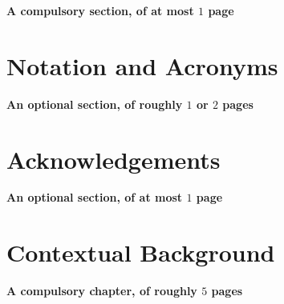 \documentclass[ %
                    author={Alexander Dalton},
                supervisor={Prof. Seth Bullock},
                    degree={MEng},
                     title={Exploring Evolutionary Hardware and its Application to Dynamic Problems},
                  subtitle={},
                      type={research},
                      year={2018} ]{dissertation}
\begin{document}
{\bf \color{red}A compulsory section, of at most $1$ page}
\vspace{1cm} 




\chapter*{Notation and Acronyms}

{\bf \color{red}An optional section, of roughly $1$ or $2$ pages}
\vspace{1cm} 




\chapter*{Acknowledgements}

{\bf \color{red}An optional section, of at most $1$ page}
\vspace{1cm} 



%

\mainmatter


\chapter{Contextual Background}
\label{chap:context}

{\bf \color{red}A compulsory chapter,     of roughly $5$ pages}
\vspace{1cm} 
\end{document}
